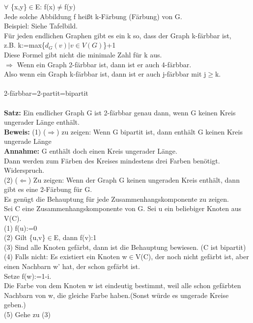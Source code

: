 \documentclass{scrartcl}
\begin{document}
	$\forall$ \{x,y\}$\in$E: f(x)$\neq$f(y)\\
	Jede solche Abbildung f heißt k-Färbung (Färbung) von G.\\
	Beispiel: Siehe Tafelbild.\\
	Für jeden endlichen Graphen  gibt es ein k so, dass der Graph k-färbbar ist,\\ z.B. k:=max\{$d_G(v)|v\in V(G)$\}+1\\
	Diese Formel gibt nicht die minimale  Zahl für k aus.\\
	$\Rightarrow$ Wenn ein Graph 2-färbbar ist, dann ist er auch 4-färbbar.\\
	Also wenn ein Graph  k-färbbar ist, dann ist er auch j-färbbar mit j$\geq$k.\\\\
	2-färbbar=2-partit=bipartit\\\\
	\textbf{Satz:} Ein endlicher Graph G ist 2-färbbar genau dann, wenn G keinen Kreis ungerader Länge enthält.\\
	\textbf{Beweis:} (1) ($\Rightarrow$) zu  zeigen: Wenn G bipartit ist, dann enthält G keinen Kreis ungerade Länge\\
	\textbf{Annahme:} G enthält doch einen Kreis ungerader Länge.\\
	Dann werden zum Färben des Kreises mindestens drei Farben benötigt. Widerspruch.\\ 
	(2) ($\Leftarrow$) Zu zeigen: Wenn der Graph G keinen ungeraden Kreis enthält, dann gibt es eine 2-Färbung für G.\\
	Es genügt die Behauptung für jede Zusammenhangskomponente zu zeigen.\\
	Sei C eine Zusammenhangskomponente von G. Sei u ein beliebiger Knoten aus V(C).\\
	(1) f(u):=0\\
	(2) Gilt \{u,v\}$\in$E, dann f(v):1\\
	(3) Sind alle Knoten gefärbt, dann ist die Behauptung bewiesen. (C ist bipartit)\\
	(4) Falls nicht: Es existiert ein Knoten w$\in$V(C), der noch nicht gefärbt ist, aber einen Nachbarn w' hat, der schon gefärbt ist.\\
	Setze f(w):=1-i.\\
	Die Farbe von dem Knoten w ist eindeutig bestimmt, weil alle schon gefärbten Nachbarn von w, die gleiche Farbe haben.(Sonst würde es ungerade Kreise geben.)\\
	(5) Gehe zu (3)\\
\end{document}
